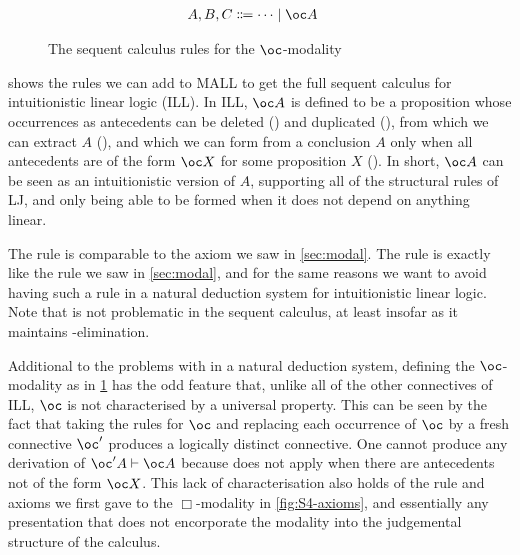 \begin{figure}
  \begin{align*}
    A, B, C &\Coloneqq \dots \mid \oc A
  \end{align*}
  \caption{The sequent calculus rules for the $\oc$-modality}
  \label{fig:bang-seq}
\end{figure}

 shows the rules we can add to MALL to get the full sequent
calculus for intuitionistic linear logic (ILL).
In ILL, $\oc A$ is defined
to be a proposition whose occurrences as antecedents can be deleted
() and duplicated (), from which we can
extract $A$ (), and which we can form from a conclusion
$A$ only when all antecedents are of the form $\oc X$ for some proposition $X$
().
In short, $\oc A$ can be seen as an intuitionistic version of $A$, supporting
all of the structural rules of LJ, and only being able to be formed when it
does not depend on anything linear.

The  rule is comparable to the  axiom we saw in
\cref{sec:modal}.
The  rule is exactly like the  rule we saw
in \cref{sec:modal}, and for the same reasons we want to avoid having such a
rule in a natural deduction system for intuitionistic linear logic.
Note that  is not problematic in the sequent calculus, at
least insofar as it maintains -elimination.

Additional to the problems with  in a natural deduction
system, defining the $\oc$-modality as in \cref{fig:bang-seq} has the odd
feature that, unlike all of the other connectives of ILL, $\oc$ is not
characterised by a universal property.
This can be seen by the fact that taking the rules for $\oc$ and replacing each
occurrence of $\oc$ by a fresh connective $\oc'$ produces a logically distinct
connective.
One cannot produce any derivation of $\oc' A \vdash \oc A$ because
 does not apply when there are antecedents not of the form
$\oc X$.
This lack of characterisation also holds of the rule and axioms we first gave to
the $\Box$-modality in \cref{fig:S4-axioms}, and essentially any presentation
that does not encorporate the modality into the judgemental structure of the
calculus.

